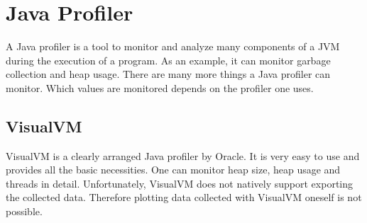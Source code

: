 \section{Java Profiler}
A Java profiler is a tool to monitor and analyze many components of a JVM during the execution of a program. As an example, it can monitor garbage collection and heap usage. There are many more things a Java profiler can monitor. Which values are monitored depends on the profiler one uses.
\subsection{VisualVM}
VisualVM is a clearly arranged Java profiler by Oracle. It is very easy to use and provides all the basic necessities. One can monitor heap size, heap usage and threads in detail. Unfortunately, VisualVM does not natively support exporting the collected data. Therefore plotting data collected with VisualVM oneself is not possible. \cite{Profiler:VisualVM}

